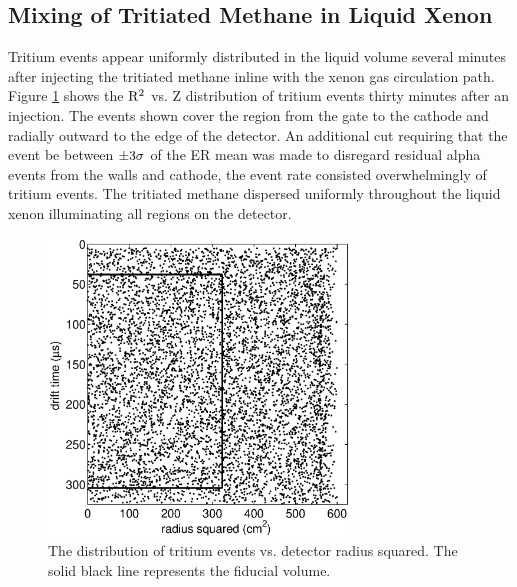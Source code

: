 \subsection{Mixing of Tritiated Methane in Liquid Xenon}

Tritium events appear uniformly distributed in the liquid volume several minutes after injecting the tritiated methane inline with the xenon gas circulation path. Figure \ref{fig:Density} shows the $\rm R^2$ vs. Z distribution of tritium events thirty minutes after an injection. The events shown cover the region from the gate to the cathode and radially outward to the edge of the detector. An additional cut requiring that the event be between $\rm \pm 3 \sigma$ of the ER mean was made to disregard residual alpha events from the walls and cathode, the event rate consisted overwhelmingly of tritium events. The tritiated methane dispersed uniformly throughout the liquid xenon illuminating all regions on the detector. 
 
\begin{figure}[h!]\centering
\includegraphics[width=80mm]{CH3T_RZ_scatter_lux10_20130812T1546.eps}
\caption{The distribution of tritium events vs. detector radius squared. The solid black line represents the fiducial volume.
}
\label{fig:Density}
\end{figure}





